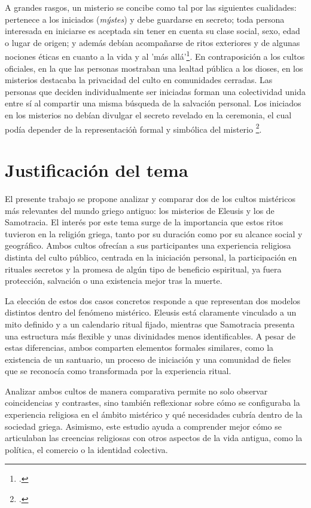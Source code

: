 A grandes rasgos, un misterio se concibe como tal por las siguientes cualidades: pertenece a los iniciados (\textit{mýstes}) y debe guardarse en secreto; toda persona interesada en iniciarse es aceptada sin tener en cuenta su clase social, sexo, edad o lugar de origen; y además debían acompañarse de ritos exteriores y de algunas nociones éticas en cuanto a la vida y al 'más allá'\footcite[113]{reyesReligionGriega2018}. En contraposición a los cultos oficiales, en la que las personas mostraban una lealtad pública a los dioses, en los misterios destacaba la privacidad del culto en comunidades cerradas. Las personas que deciden individualmente ser iniciadas forman una colectividad unida entre sí al compartir una misma búsqueda de la salvación personal. Los iniciados en los misterios no debían divulgar el secreto revelado en la ceremonia, el cual podía depender de la representacióǹ formal y simbólica del misterio \footcite[5]{w.meyerAncientMysteriesSource1986}.

\section{Justificación del tema}

El presente trabajo se propone analizar y comparar dos de los cultos mistéricos más relevantes del mundo griego antiguo: los misterios de Eleusis y los de Samotracia. El interés por este tema surge de la importancia que estos ritos tuvieron en la religión griega, tanto por su duración como por su alcance social y geográfico. Ambos cultos ofrecían a sus participantes una experiencia religiosa distinta del culto público, centrada en la iniciación personal, la participación en rituales secretos y la promesa de algún tipo de beneficio espiritual, ya fuera protección, salvación o una existencia mejor tras la muerte.

La elección de estos dos casos concretos responde a que representan dos modelos distintos dentro del fenómeno mistérico. Eleusis está claramente vinculado a un mito definido y a un calendario ritual fijado, mientras que Samotracia presenta una estructura más flexible y unas divinidades menos identificables. A pesar de estas diferencias, ambos comparten elementos formales similares, como la existencia de un santuario, un proceso de iniciación y una comunidad de fieles que se reconocía como transformada por la experiencia ritual.

Analizar ambos cultos de manera comparativa permite no solo observar coincidencias y contrastes, sino también reflexionar sobre cómo se configuraba la experiencia religiosa en el ámbito mistérico y qué necesidades cubría dentro de la sociedad griega. Asimismo, este estudio ayuda a comprender mejor cómo se articulaban las creencias religiosas con otros aspectos de la vida antigua, como la política, el comercio o la identidad colectiva.


